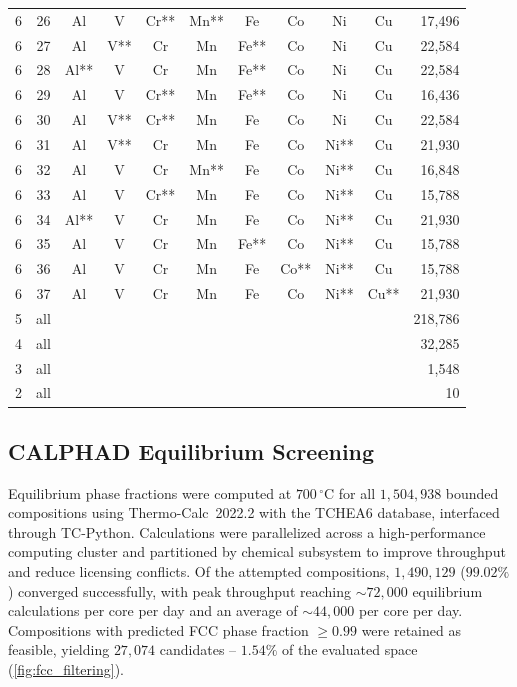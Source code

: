 \documentclass[final,5p,times,twocolumn]{elsarticle}
\begin{document}
\begin{longtable}{ccccccccccr}
6 & 26 & Al & V  & Cr** & Mn** & Fe & Co & Ni & Cu & 17{,}496 \\
6 & 27 & Al & V** & Cr & Mn & Fe** & Co & Ni & Cu & 22{,}584 \\
6 & 28 & Al** & V  & Cr & Mn & Fe** & Co & Ni & Cu & 22{,}584 \\
6 & 29 & Al & V  & Cr** & Mn & Fe** & Co & Ni & Cu & 16{,}436 \\
6 & 30 & Al & V** & Cr** & Mn & Fe & Co & Ni & Cu & 22{,}584 \\
6 & 31 & Al & V** & Cr & Mn & Fe & Co & Ni** & Cu & 21{,}930 \\
6 & 32 & Al & V  & Cr & Mn** & Fe & Co & Ni** & Cu & 16{,}848 \\
6 & 33 & Al & V  & Cr** & Mn & Fe & Co & Ni** & Cu & 15{,}788 \\
6 & 34 & Al** & V  & Cr & Mn & Fe & Co & Ni** & Cu & 21{,}930 \\
6 & 35 & Al & V  & Cr & Mn & Fe** & Co & Ni** & Cu & 15{,}788 \\
6 & 36 & Al & V  & Cr & Mn & Fe & Co** & Ni** & Cu & 15{,}788 \\
6 & 37 & Al & V  & Cr & Mn & Fe & Co & Ni** & Cu** & 21{,}930 \\
\hline
5 & all &    &    &    &    &    &    &    &    & 218{,}786 \\
4 & all &    &    &    &    &    &    &    &    & 32{,}285 \\
3 & all &    &    &    &    &    &    &    &    & 1{,}548 \\
2 & all &    &    &    &    &    &    &    &    & 10 \\
\hline
\end{longtable}
\twocolumn

\subsection{CALPHAD Equilibrium Screening}
 
Equilibrium phase fractions were computed at $700\,^{\circ}$C for all $1{,}504{,}938$ bounded compositions using Thermo-Calc~2022.2 with the TCHEA6 database, interfaced through TC-Python. Calculations were parallelized across a high-performance computing cluster and partitioned by chemical subsystem to improve throughput and reduce licensing conflicts. Of the attempted compositions, $1{,}490{,}129$ ($99.02\%$) converged successfully, with peak throughput reaching ${\sim}72{,}000$ equilibrium calculations per core per day and an average of ${\sim}44{,}000$ per core per day. Compositions with predicted FCC phase fraction $\geq 0.99$ were retained as feasible, yielding $27{,}074$ candidates -- $1.54\%$ of the evaluated space (\autoref{fig:fcc_filtering}).
 
\end{document}
